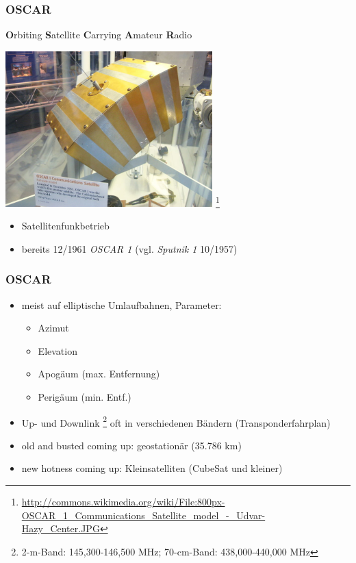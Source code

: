\begin{frame}
    \frametitle{OSCAR}


    \textbf{O}rbiting \textbf{S}atellite \textbf{C}arrying \textbf{A}mateur \textbf{R}adio

    \begin{center}
        \includegraphics[width=0.6\textwidth]{bv11/OSCAR1.jpg}
        \footnote{\tiny \url{http://commons.wikimedia.org/wiki/File:800px-OSCAR_1_Communications_Satellite_model_-_Udvar-Hazy_Center.JPG}}
    \end{center}

    \begin{itemize}
        \item Satellitenfunkbetrieb
        \item bereits 12/1961 \emph{OSCAR 1} (vgl. \emph{Sputnik 1} 10/1957)
    \end{itemize}

\end{frame}

\begin{frame}
    \frametitle{OSCAR}

    \begin{itemize}
        \item meist auf elliptische Umlaufbahnen, Parameter:
        \begin{itemize}
            \item Azimut
            \item Elevation
            \item Apogäum (max. Entfernung)
            \item Perigäum (min. Entf.)
        \end{itemize}
        \item Up- und Downlink
              \footnote{2-m-Band: 145,300-146,500 MHz; 70-cm-Band: 438,000-440,000 MHz}
              oft in verschiedenen Bändern (Transponderfahrplan)
        \item old and busted coming up: geostationär (35.786 km)
        \item new hotness coming up: Kleinsatelliten (CubeSat und kleiner)
    \end{itemize}

\end{frame}

